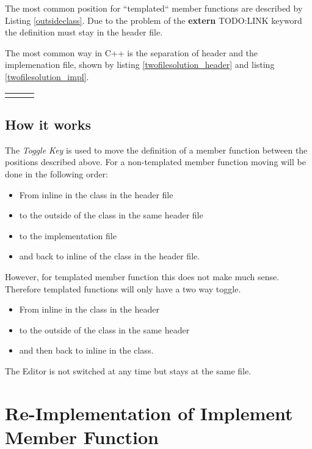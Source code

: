 \documentclass[a4paper,12pt,abstract=on]{scrreprt}
\begin{document}
The most common position for ``templated`` member functions are described by
Listing \ref{outsideclass}. Due to the problem of the \textbf{extern} TODO:LINK
keyword the definition must stay in the header file.


The most common way in C++ is the separation of header and the implemenation
file, shown by listing \ref{twofilesolution_header} and listing
\ref{twofilesolution_impl}.

\begin{tabular}{p{5cm}p{.5cm}p{6cm}}

& & 

\end{tabular}

\subsection{How it works}

The \textit{Toggle Key} is used to move the definition of a member function
between the positions described above. For a non-templated member function
moving will be done in the following order:
\begin{itemize}
 \item From inline in the class in the header file
 \item to the outside of the class in the same header file
 \item to the implementation file
 \item and back to inline of the class in the header file.
\end{itemize}

However, for templated member function this does not make much sense. Therefore
templated functions will only have a two way toggle.
\begin{itemize}
 \item From inline in the class in the header
 \item to the outside of the class in the same header
 \item and then back to inline in the class.
\end{itemize}

The Editor is not switched at any time but stays at the same file.

\section{Re-Implementation of Implement Member Function}
\end{document}
